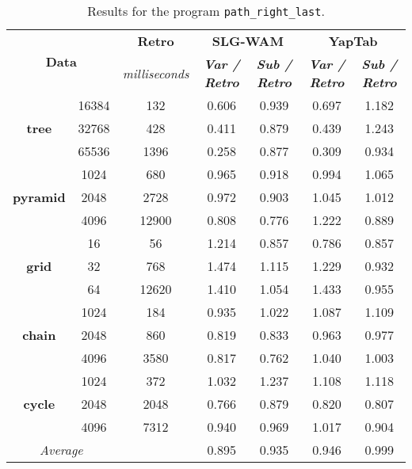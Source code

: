 \begin{table}[ht]
\centering
\footnotesize{
  \begin{tabular}{cc|c|cc|cc}
   \hline
    \hline
    \multicolumn{2}{c|}{\multirow{2}{*}{\small{\textbf{Data}}}} & \textbf{\small{Retro}} & \multicolumn{2}{c|}{\small{\textbf{SLG-WAM}}} & \multicolumn{2}{c}{\small{\textbf{YapTab}}} \\
     \multicolumn{2}{c|}{} & \scriptsize{\textit{milliseconds}} & \textbf{\textit{\scriptsize{Var / Retro}}} & \textbf{\textit{\scriptsize{Sub / Retro}}} & \textbf{\textit{\scriptsize{Var / Retro}}} & \textbf{\textit{\scriptsize{Sub / Retro}}} \\
   \hline
   \hline

\multirow{3}{*}{\textbf{tree}} &  16384 &  132 &  0.606  &  0.939  &  0.697 & 1.182 \\
&  32768 &  428 &  0.411  &  0.879  &  0.439 & 1.243 \\
&  65536 &  1396 &  0.258  &  0.877  &  0.309 & 0.934 \\
\hline
\multirow{3}{*}{\textbf{pyramid}} &  1024 &  680 &  0.965  &  0.918  &  0.994 & 1.065 \\
&  2048 &  2728 &  0.972  &  0.903  &  1.045 & 1.012 \\
&  4096 &  12900 &  0.808  &  0.776  &  1.222 & 0.889 \\
\hline
\multirow{3}{*}{\textbf{grid}} &  16 &  56 &  1.214  &  0.857  &  0.786 & 0.857 \\
&  32 &  768 &  1.474  &  1.115  &  1.229 & 0.932 \\
&  64 &  12620 &  1.410  &  1.054  &  1.433 & 0.955 \\
\hline
\multirow{3}{*}{\textbf{chain}} &  1024 &  184 &  0.935  &  1.022  &  1.087 & 1.109 \\
&  2048 &  860 &  0.819  &  0.833  &  0.963 & 0.977 \\
&  4096 &  3580 &  0.817  &  0.762  &  1.040 & 1.003 \\
\hline
\multirow{3}{*}{\textbf{cycle}} &  1024 &  372 &  1.032  &  1.237  &  1.108 & 1.118 \\
&  2048 &  2048 &  0.766  &  0.879  &  0.820 & 0.807 \\
&  4096 &  7312 &  0.940  &  0.969  &  1.017 & 0.904 \\
\hline
\hline
\multicolumn{2}{c}{\textit{Average}} & & 0.895 & 0.935 & 0.946 & 0.999 \\ 
\hline
\hline
\end{tabular}
}
\caption{Results for the program \texttt{path\_right\_last}.}
\label{tbl:prefix_path_right_last}
\end{table}

